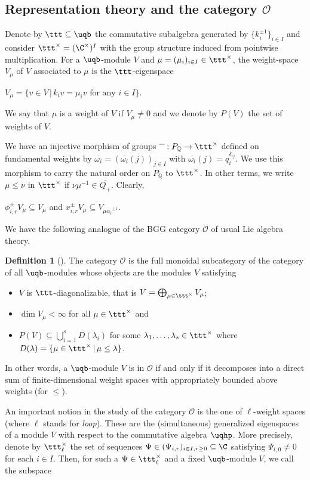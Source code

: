 \documentclass[11pt]{amsart}
\theoremstyle{definition}
\newtheorem{defn}[theorem]{Definition}
\theoremstyle{remark}
\numberwithin{equation}{section}
\begin{document}
\subsection{Representation theory and the category $\mathcal{O}$}\label{sec:O}
 Denote by $\ttt\subseteq \uqb$ the commutative subalgebra generated by $\{k_i^{\pm 1}\}_{i\in I}$ and consider $\ttt^{\times} = (\C^{\times})^I$ with the group structure induced from pointwise multiplication. For a $\uqb$-module $V$ and $\mu = (\mu_i)_{i\in I} \in \ttt^{\times}$, the weight-space $V_{\mu}$ of $V$ associated to $\mu$ is the $\ttt$-eigenspace
\begin{center}
$V_{\mu} = \{v\in V\,|\, k_i v = \mu_i v\text{ for any } i\in I\}$.
\end{center}
We say that $\mu$ is a weight of $V$ if $V_{\mu}\neq 0$ and we denote by $P(V)$ the set of weights of $V$. \par We have an injective morphism of groups $\overline{\textcolor{white}{\alpha}} : P_{\mathbb{Q}} \rightarrow \ttt^{\times}$ defined on fundamental weights by $\overline{\omega_i} = (\overline{\omega_i}(j))_{j\in I}$ with $\overline{\omega_i}(j) = q_i ^{\delta_{ij}}$. We use this morphism to carry the natural order on $P_{\mathbb{Q}}$ to $\ttt^{\times}$. In other terms, we write $\mu \leq \nu$ in $\ttt^{\times}$ if $\nu\mu^{-1}\in\overline{Q_+}$. Clearly,
\begin{center}
$\phi_{i,r}^{\pm} V_{\mu} \subseteq V_{\mu}$ and $x_{i,r}^{\pm} V_{\mu} \subseteq V_{\mu\overline{\alpha_i}^{\pm 1}}$.
\end{center}
We have the following analogue of the BGG category $\mathcal{O}$ of usual Lie algebra theory.
\begin{defn}[{\cite[Definition 3.8]{hj}}]\label{def:O} The category $\mathcal{O}$ is the full monoidal subcategory of the category of all $\uqb$-modules whose objects are the modules $V$ satisfying
\begin{itemize}
\item[(i)] $V$ is $\ttt$-diagonalizable, that is $V = \bigoplus_{\mu \in \ttt^{\times}} V_{\mu}$;
\item[(ii)] $\dim V_{\mu} < \infty$ for all $\mu \in \ttt^{\times}$ and
\item[(iii)] $P(V) \subseteq \bigcup_{i=1}^s D(\lambda_i)$ for some $\lambda_1,\dots ,\lambda_s\in \ttt^{\times}$ where $D(\lambda) = \{\mu \in \ttt^{\times}\,|\, \mu\leq \lambda\}$.
\end{itemize}
\end{defn}
In other words, a $\uqb$-module $V$ is in $\mathcal{O}$ if and only if it decomposes into a direct sum of finite-dimensional weight spaces with appropriately bounded above weights (for $\leq$). \par An important notion in the study of the category $\mathcal{O}$ is the one of $\ell$-weight spaces (where $\ell$ stands for \textit{loop}). These are the (simultaneous) generalized eigenspaces of a module $V$ with respect to the commutative algebra $\uqhp$. More precisely, denote by $\ttt_{\ell}^{\times}$ the set of sequences $\Psi \in (\Psi_{i,r})_{i\in I,r\geq 0} \subseteq \C$ satisfying $\Psi_{i,0} \neq 0$ for each $i\in I$. Then, for such a $\Psi \in \ttt^{\times}_{\ell}$ and a fixed $\uqb$-module $V$, we call the subspace 
\end{document}
